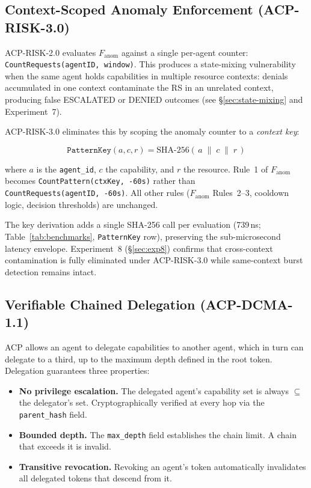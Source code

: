 \documentclass[11pt]{article}
\theoremstyle{definition}
\begin{document}
\subsection{Context-Scoped Anomaly Enforcement (ACP-RISK-3.0)}
\label{sec:risk30}

ACP-RISK-2.0 evaluates $F_{\text{anom}}$ against a single per-agent counter:
\texttt{CountRequests(agentID, window)}.
This produces a state-mixing vulnerability when the same agent holds capabilities in multiple
resource contexts: denials accumulated in one context contaminate the RS in an unrelated context,
producing false ESCALATED or DENIED outcomes (see \S\ref{sec:state-mixing} and Experiment~7).

ACP-RISK-3.0 eliminates this by scoping the anomaly counter to a \emph{context key}:

\[
\texttt{PatternKey}(a, c, r) = \text{SHA-256}(\,a \;\|\; c \;\|\; r\,)
\]

\noindent where $a$ is the \texttt{agent\_id}, $c$ the capability, and $r$ the resource.
Rule~1 of $F_{\text{anom}}$ becomes \texttt{CountPattern(ctxKey,\,-60s)} rather than
\texttt{CountRequests(agentID,\,-60s)}.
All other rules ($F_{\text{anom}}$ Rules~2--3, cooldown logic, decision thresholds) are unchanged.

The key derivation adds a single SHA-256 call per evaluation (739\,ns;
Table~\ref{tab:benchmarks}, \texttt{PatternKey} row),
preserving the sub-microsecond latency envelope.
Experiment~8 (\S\ref{sec:exp8}) confirms that cross-context contamination is fully eliminated
under ACP-RISK-3.0 while same-context burst detection remains intact.

\subsection{Verifiable Chained Delegation (ACP-DCMA-1.1)}

ACP allows an agent to delegate capabilities to another agent, which in turn can delegate to a third,
up to the maximum depth defined in the root token.
Delegation guarantees three properties:

\begin{itemize}[noitemsep]
  \item \textbf{No privilege escalation.}
        The delegated agent's capability set is always $\subseteq$ the delegator's set.
        Cryptographically verified at every hop via the \texttt{parent\_hash} field.
  \item \textbf{Bounded depth.}
        The \texttt{max\_depth} field establishes the chain limit. A chain that exceeds it is invalid.
  \item \textbf{Transitive revocation.}
        Revoking an agent's token automatically invalidates all delegated tokens that descend from it.
\end{itemize}
\end{document}
